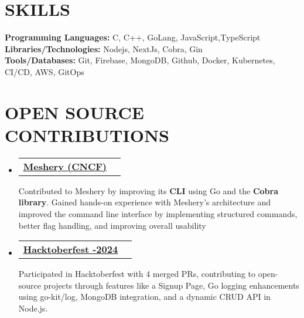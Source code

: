 \documentclass[letterpaper,11pt]{article}
\makeatletter
\newcommand{\resumeItem}[1]{
  \item\small{
    {#1 \vspace{-2pt}}
  }
}
\newcommand{\resumeProjectHeading}[2]{
    \item
    \begin{tabular*}{1.001\textwidth}{l@{\extracolsep{\fill}}r}
      \small#1 & \textbf{\small #2}\\
    \end{tabular*}\vspace{-7pt}
}
\newcommand{\resumeSubHeadingListStart}{\begin{itemize}[leftmargin=0.0in, label={}]}
\newcommand{\resumeItemListEnd}{\end{itemize}\vspace{-5pt}}
\makeatother
\begin{document}
\section{SKILLS}
 \begin{itemize}[leftmargin=0.15in, label={}]
    \small{\item{
     \textbf{\normalsize{Programming Languages:}}{ \normalsize{C, C++, GoLang, JavaScript,TypeScript}} \\
     \textbf{\normalsize{Libraries/Technologies:}}{\normalsize{ Nodejs, NextJs, Cobra, Gin}}
     \\
     \textbf{\normalsize{Tools/Databases:}}{\normalsize{ Git, Firebase, MongoDB, Github, Docker, Kubernetes, CI/CD, AWS, GitOps}}
    }}
 \end{itemize}
 \vspace{-14pt}
\section{OPEN SOURCE CONTRIBUTIONS}
\vspace{-5pt}
\resumeSubHeadingListStart


\resumeProjectHeading
{\href{https://github.com/meshery/meshery}{\textbf{\large{\underline{Meshery (CNCF)}}}} 
\href{https://gist.github.com/Arpit529Srivastava/7f690bca6f7bc55bbc7b2f53d274bc02}{\raisebox{-0.1\height}\faExternalLink}}

\resumeItem{\normalsize{Contributed to Meshery by improving its \textbf{CLI} using Go and the \textbf{Cobra library}. Gained hands-on experience with Meshery's architecture and improved the command line interface by implementing structured commands, better flag handling, and improving overall usability}}

\vspace{-12pt}

\resumeProjectHeading
{\href{}{\textbf{\large\underline{Hacktoberfest -2024}} } 
\href{https://gist.github.com/Arpit529Srivastava/b3f9f6159ac0b07b2a85ca01ed1ba138}{\raisebox{-0.1\height}{\faExternalLink}}}

\resumeItem{\normalsize{Participated in Hacktoberfest with 4 merged PRs, contributing to open-source projects through features like a Signup Page, Go logging enhancements using go-kit/log, MongoDB integration, and a dynamic CRUD API in Node.js.}}
\resumeItemListEnd

\vspace{-8pt} %
\end{document}
